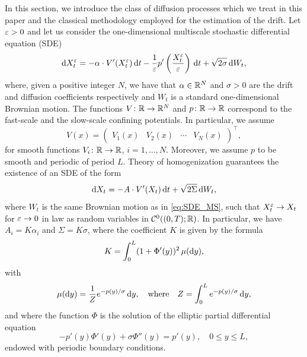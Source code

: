 \documentclass[10pt]{article}
\begin{document}
In this section, we introduce the class of diffusion processes which we treat in this paper and the classical methodology employed for the estimation of the drift. Let $\varepsilon > 0$ and let us consider the one-dimensional multiscale stochastic differential equation (SDE)
\begin{equation}\label{eq:SDE_MS}
	\mathrm{d} X_t^\varepsilon = -\alpha \cdot V'(X_t^\varepsilon) \,\mathrm{d} t - \frac1{\varepsilon} p'\left(\frac{X_t^\varepsilon}{\varepsilon}\right) \,\mathrm{d} t + \sqrt{2\sigma} \,\mathrm{d} W_t,
\end{equation}
where, given a positive integer $N$, we have that $\alpha \in \mathbb{R}^N$ and $\sigma > 0$ are the drift and diffusion coefficients respectively and $W_t$ is a standard one-dimensional Brownian motion. The functions $V\colon \mathbb{R} \to \mathbb{R}^N$ and $p\colon \mathbb{R} \to \mathbb{R}$ correspond to the fast-scale and the slow-scale confining potentials. In particular, we assume 
\begin{equation}\label{eq:Potential}
	V(x) = \begin{pmatrix} V_1(x) & V_2(x) & \cdots & V_N(x) \end{pmatrix}^\top,
\end{equation}
for smooth functions $V_i\colon \mathbb{R} \to \mathbb{R}$, $i = 1, \ldots, N$. Moreover, we assume $p$ to be smooth and periodic of period $L$. Theory of homogenization \cite[Chapter 3]{BLP78} guarantees the existence of an SDE of the form
\begin{equation}\label{eq:SDE_HOM}
	\mathrm{d} X_t = - A \cdot V'(X_t) \,\mathrm{d} t + \sqrt{2\Sigma} \,\mathrm{d} W_t,
\end{equation}
where $W_t$ is the same Brownian motion as in \eqref{eq:SDE_MS}, such that $X_t^\varepsilon \to X_t$ for $\varepsilon\to 0$ in law as random variables in $\mathcal C^0((0, T); \mathbb{R})$. In particular, we have $A_i = K\alpha_i$ and $\Sigma = K \sigma$, where the coefficient $K$ is given by the formula
\begin{equation}\label{eq:K_HOM}
	K = \int_0^L (1 + \Phi'(y))^2 \, \mu(\mathrm{d} y),
\end{equation}
with 
\begin{equation}
	\mu(\mathrm{d} y) = \frac1Z e^{-p(y)/\sigma} \,\mathrm{d} y, \quad\text{where}\quad Z = \int_0^L e^{-p(y)/\sigma} \,\mathrm{d} y,
\end{equation}
and where the function $\Phi$ is the solution of the elliptic partial differential equation
\begin{equation}
	-p'(y)\Phi'(y) + \sigma \Phi''(y) = p'(y), \quad 0 \leq y \leq L,
\end{equation}
endowed with periodic boundary conditions.
\end{document}
